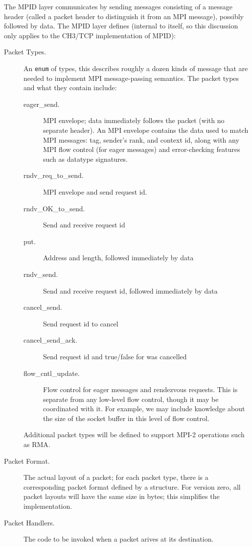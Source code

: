 \documentclass{article}
\def\code{\begingroup\makeustext\eatcode}
\def\eatcode#1{\texttt{#1}\endgroup}
\begin{document}
The MPID layer communicates by sending messages consisting of a message header
(called a packet header to distinguish it from an MPI message), possibly
followed by data.  The MPID layer defines (internal to itself, so this
discussion only applies to the CH3/TCP implementation of MPID):
\begin{description}
\item[Packet Types.]An \code{enum} of types, this describes roughly a
dozen kinds of 
  message that are needed to implement MPI message-passing semantics.  The
  packet types and what they contain include:
  \begin{description}
    \item[eager\_send.] MPI envelope; data immediately follows the packet (with
      no separate header).  An MPI envelope contains the data used to match
      MPI messages: tag, sender's rank, and context id, along with any MPI 
      flow control (for eager messages) and error-checking features such as
      datatype signatures.
    \item[rndv\_req\_to\_send.]MPI envelope and send request id.
    \item[rndv\_OK\_to\_send.]Send and receive request id
    \item[put.]Address and length, followed immediately by data
    \item[rndv\_send.]Send and receive request id, followed immediately by data
    \item[cancel\_send.]Send request id to cancel
    \item[cancel\_send\_ack.]Send request id and true/false for was cancelled
    \item[flow\_cntl\_update.]Flow control for eager messages and rendezvous
      requests.  This is separate from any low-level flow control, though it
      may be coordinated with it.  For example, we may include knowledge about
      the size of the socket buffer in this level of flow control.
    \end{description}
    Additional packet types will be defined to support MPI-2 operations such
    as RMA.
\item[Packet Format.]The actual layout of a packet; for each packet type, there
  is a corresponding packet format defined by a structure.  For version zero,
  all packet layouts will have the same size in bytes; this simplifies
  the implementation.
\item[Packet Handlers.]The code to be invoked when a packet arives at its
  destination. 
\end{description}
\end{document}
